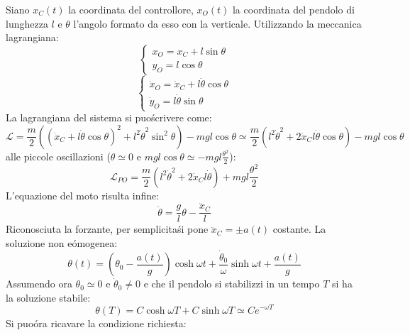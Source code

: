 \documentclass[12pt, a4paper]{book}
\theoremstyle{theorem}
\begin{document}
				Siano $x_{C}(t)$ la coordinata del controllore, $x_{O}(t)$ la coordinata del pendolo di lunghezza $l$ e $\theta$ l'angolo formato da esso con la verticale.
				Utilizzando la meccanica lagrangiana:
				\begin{equation*}
					\begin{cases}
						x_{O}=x_{C}+l\sin\theta\\
						y_{O}=l\cos\theta
					\end{cases}
				\end{equation*}
				\begin{equation*}
					\begin{cases}
						\dot{x}_O=\dot{x}_{C}+l\dot{\theta}\cos\theta\\
						\dot{y}_{O}=l\dot{\theta}\sin\theta
					\end{cases}
				\end{equation*}
				La lagrangiana del sistema si puo\' scrivere come:
				\begin{equation*}
					\mathcal{L}=\frac{m}{2}\left( \left( \dot{x}_{C}+l\dot{\theta}\cos\theta \right)^2 + l^2\dot{\theta}^2\sin^2\theta \right) - mgl\cos\theta \simeq \frac{m}{2}\left( l^2\dot{\theta}^2 + 2\dot{x}_{C}l\dot{\theta}\cos\theta \right) - mgl\cos\theta
				\end{equation*}
				alle piccole oscillazioni ($\theta\simeq 0$ e $mgl\cos\theta\simeq -mgl\frac{\theta^2}{2}$):
				\begin{equation*}
					\mathcal{L}_{PO}=\frac{m}{2}\left( l^2\dot{\theta}^2 + 2\dot{x}_{C}l\dot{\theta} \right) + mgl\frac{\theta^2}{2}
				\end{equation*}
				L'equazione del moto risulta infine:
				\begin{equation}
					\ddot{\theta}=\frac{g}{l}\theta - \frac{\ddot{x}_C}{l}
				\end{equation}
				Riconosciuta la forzante, per semplicita\' si pone $\ddot{x}_C=\pm a(t)$ costante.
				La soluzione non e\' omogenea:
				\begin{equation*}
					\theta(t)=\left( \theta_{0} -\frac{a(t)}{g} \right)\cosh\omega t + \frac{\dot{\theta}_0}{\omega}\sinh\omega t +\frac{a(t)}{g}
				\end{equation*}
				Assumendo ora $\theta_0\simeq 0$ e $\dot{\theta}_0\neq 0$ e che il pendolo si stabilizzi in un tempo $T$ si ha la soluzione stabile:
				\begin{equation*}
					\theta(T)=C\cosh\omega T + C\sinh\omega T \simeq Ce^{-\omega T}
				\end{equation*}
				Si puo\' ora ricavare la condizione richiesta:
\end{document}

